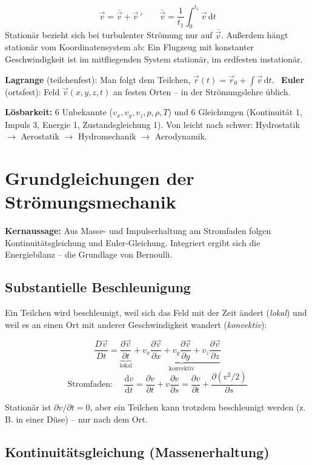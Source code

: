\documentclass[11pt,a4paper]{article}
\newcommand{\dd}{\mathrm{d}}
\begin{document}
\[
\vec v = \bar{\vec v} + \vec v\,' \qquad \bar{\vec v} = \frac{1}{t_1}\int_0^{t_1}\vec v\,\dd t
\]
\glqq Stationär\grqq{} bezieht sich bei turbulenter Strömung nur auf $\bar{\vec v}$. Außerdem hängt \glqq stationär\grqq{} vom Koordinatensystem ab: Ein Flugzeug mit konstanter Geschwindigkeit ist im mitfliegenden System stationär, im erdfesten instationär.

\textbf{Lagrange} (teilchenfest): Man folgt dem Teilchen, $\vec r(t) = \vec r_0 + \int \vec v\,\dd t$. \
\textbf{Euler} (ortsfest): Feld $\vec v(x,y,z,t)$ an festen Orten -- in der Strömungslehre üblich.

\textbf{Lösbarkeit:} 6 Unbekannte ($v_x, v_y, v_z, p, \rho, T$) und 6 Gleichungen (Kontinuität 1, Impuls 3, Energie 1, Zustandsgleichung 1). Von leicht nach schwer: Hydrostatik $\to$ Aerostatik $\to$ Hydromechanik $\to$ Aerodynamik.

\section{Grundgleichungen der Strömungsmechanik}

\textbf{Kernaussage:} Aus Masse- und Impulserhaltung am Stromfaden folgen Kontinuitätsgleichung und Euler-Gleichung. Integriert ergibt sich die Energiebilanz -- die Grundlage von Bernoulli.

\subsection{Substantielle Beschleunigung}

Ein Teilchen wird beschleunigt, weil sich das Feld mit der Zeit ändert (\emph{lokal}) und weil es an einen Ort mit anderer Geschwindigkeit wandert (\emph{konvektiv}):
\begin{formel}
\[
\frac{D\vec v}{Dt} = \underbrace{\frac{\partial \vec v}{\partial t}}_{\text{lokal}} + \underbrace{v_x\frac{\partial \vec v}{\partial x} + v_y\frac{\partial \vec v}{\partial y} + v_z\frac{\partial \vec v}{\partial z}}_{\text{konvektiv}}
\]
\[
\text{Stromfaden: }\quad
\frac{\dd v}{\dd t} = \frac{\partial v}{\partial t} + v\frac{\partial v}{\partial s} = \frac{\partial v}{\partial t} + \frac{\partial (v^2/2)}{\partial s}
\]
\end{formel}
Stationär ist $\partial v/\partial t = 0$, aber ein Teilchen kann trotzdem beschleunigt werden (z.\,B. in einer Düse) -- nur nach dem Ort.

\subsection{Kontinuitätsgleichung (Massenerhaltung)}
\end{document}
